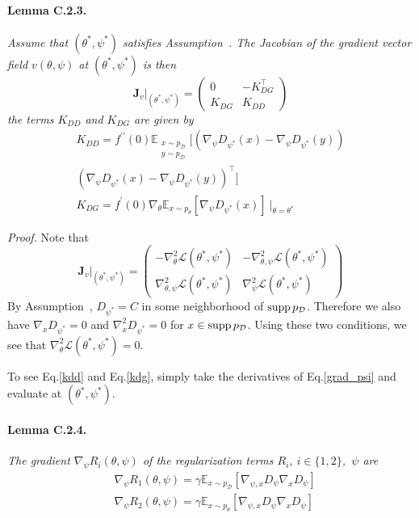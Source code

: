 \paragraph{Lemma C.2.3.} \emph{Assume that $(\theta^*,\psi^*)$ satisfies Assumption~. The Jacobian of the gradient vector field $v(\theta,\psi)$ at $(\theta^*,\psi^*)$ is then}
\begin{equation}
\textbf{J}_v\biggr\rvert_{(\theta^*,\psi^*)}=\begin{pmatrix}
0 & -K^\top_{DG}\\ 
K_{DG} & K_{DD}
\end{pmatrix}
\end{equation}
\emph{the terms $K_{DD}$ and $K_{DG}$ are given by}
\begin{align}
\label{kdd}
K_{DD}=f^{\prime\prime}(0)\mathbb{E}_{\substack{x\sim p_\mathcal{D}\\y\sim p_\mathcal{D}}}[(\nabla_\psi D_{\psi^*}(x)-\nabla_\psi D_{\psi^*}(y)) \nonumber \\
(\nabla_\psi D_{\psi^*}(x)-\nabla_\psi D_{\psi^*}(y))^\top] \\
\label{kdg}
K_{DG}=f^\prime(0)\nabla_\theta\mathbb{E}_{x\sim p_\theta}[\nabla_\psi D_{\psi^*}(x)]\ \rvert_{\theta=\theta^*}
\end{align}

\emph{Proof.} Note that
\begin{equation}
\textbf{J}_v\biggr\rvert_{(\theta^*,\psi^*)}=\begin{pmatrix}
-\nabla^2_\theta\mathcal{L}(\theta^*,\psi^*) & -\nabla^2_{\theta,\psi}\mathcal{L}(\theta^*,\psi^*) \\ 
\nabla^2_{\theta,\psi}\mathcal{L}(\theta^*,\psi^*) & \nabla^2_\psi\mathcal{L}(\theta^*,\psi^*)
\end{pmatrix}
\end{equation}
By Assumption~, $D_{\psi^*}=C$ in some neighborhood of $\operatorname{supp} p_\mathcal{D}$. Therefore we also have $\nabla_x D_{\psi^*}=0$ and $\nabla^2_x D_{\psi^*}=0$ for $x\in\operatorname{supp} p_\mathcal{D}$. Using these two conditions, we see that $\nabla^2_\theta\mathcal{L}(\theta^*,\psi^*)=0$.

To see Eq.\ref{kdd} and Eq.\ref{kdg}, simply take the derivatives of Eq.\ref{grad_psi} and evaluate at $(\theta^*,\psi^*)$.

\paragraph{Lemma C.2.4.} \emph{The gradient $\nabla_\psi R_i(\theta,\psi)$ of the regularization terms $R_i$, $i\in\{1,2\}$,~\wrt $\psi$ are}
\begin{align}
&\nabla_\psi R_1(\theta,\psi)=\gamma\mathbb{E}_{x\sim p_\mathcal{D}}[\nabla_{\psi,x}D_\psi\nabla_xD_\psi] \\
&\nabla_\psi R_2(\theta,\psi)=\gamma\mathbb{E}_{x\sim p_\theta}[\nabla_{\psi,x}D_\psi\nabla_xD_\psi]
\end{align}

